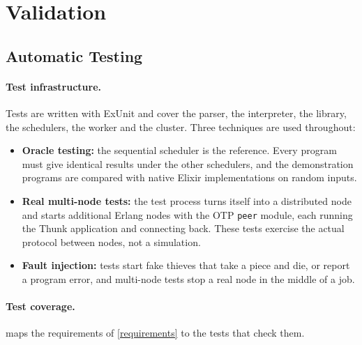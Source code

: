 \documentclass{scrartcl}
\begin{document}
\section{Validation}\label{validation}

\subsection{Automatic Testing}\label{automatic-testing}

\paragraph{Test infrastructure.}
Tests are written with ExUnit and cover the parser, the interpreter, the library, the schedulers, the worker and the cluster.
%
Three techniques are used throughout:
%
\begin{itemize}
  \item \textbf{Oracle testing:} the sequential scheduler is the reference. Every program must give identical results under the other schedulers, and the demonstration programs are compared with native Elixir implementations on random inputs.
  \item \textbf{Real multi-node tests:} the test process turns itself into a distributed node and starts additional Erlang nodes with the OTP \texttt{peer} module, each running the Thunk application and connecting back. These tests exercise the actual protocol between nodes, not a simulation.
  \item \textbf{Fault injection:} tests start fake thieves that take a piece and die, or report a program error, and multi-node tests stop a real node in the middle of a job.
\end{itemize}

\paragraph{Test coverage.}
 maps the requirements of \cref{requirements} to the tests that check them.
\end{document}
